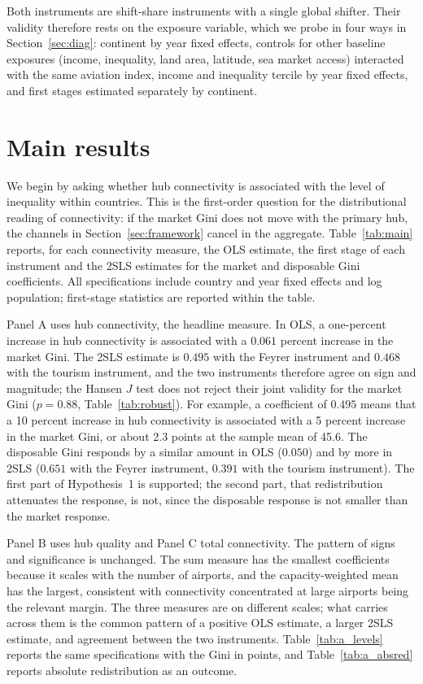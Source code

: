 Both instruments are shift-share instruments with a single global shifter. Their validity therefore rests on the exposure variable, which we probe in four ways in Section~\ref{sec:diag}: continent by year fixed effects, controls for other baseline exposures (income, inequality, land area, latitude, sea market access) interacted with the same aviation index, income and inequality tercile by year fixed effects, and first stages estimated separately by continent.

\section{Main results}
\label{sec:results}
We begin by asking whether hub connectivity is associated with the level of inequality within countries. This is the first-order question for the distributional reading of connectivity: if the market Gini does not move with the primary hub, the channels in Section~\ref{sec:framework} cancel in the aggregate. Table~\ref{tab:main} reports, for each connectivity measure, the OLS estimate, the first stage of each instrument and the 2SLS estimates for the market and disposable Gini coefficients. All specifications include country and year fixed effects and log population; first-stage statistics are reported within the table.

Panel A uses hub connectivity, the headline measure. In OLS, a one-percent increase in hub connectivity is associated with a $0.061$ percent increase in the market Gini. The 2SLS estimate is $0.495$ with the Feyrer instrument and $0.468$ with the tourism instrument, and the two instruments therefore agree on sign and magnitude; the Hansen $J$ test does not reject their joint validity for the market Gini ($p=0.88$, Table~\ref{tab:robust}). For example, a coefficient of $0.495$ means that a 10 percent increase in hub connectivity is associated with a 5 percent increase in the market Gini, or about 2.3 points at the sample mean of 45.6. The disposable Gini responds by a similar amount in OLS ($0.050$) and by more in 2SLS ($0.651$ with the Feyrer instrument, $0.391$ with the tourism instrument). The first part of Hypothesis~1 is supported; the second part, that redistribution attenuates the response, is not, since the disposable response is not smaller than the market response.

Panel B uses hub quality and Panel C total connectivity. The pattern of signs and significance is unchanged. The sum measure has the smallest coefficients because it scales with the number of airports, and the capacity-weighted mean has the largest, consistent with connectivity concentrated at large airports being the relevant margin. The three measures are on different scales; what carries across them is the common pattern of a positive OLS estimate, a larger 2SLS estimate, and agreement between the two instruments. Table~\ref{tab:a_levels} reports the same specifications with the Gini in points, and Table~\ref{tab:a_absred} reports absolute redistribution as an outcome.

